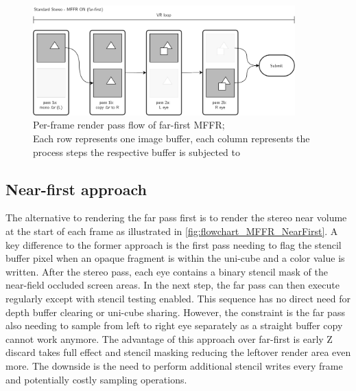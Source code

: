 \begin{figure}[htb]
  \centering
  \includegraphics[width=0.9\textwidth]{pictures/MFFR_farfirst}
  \caption{Per-frame render pass flow of far-first \gls{MFFR}; \\
  Each row represents one image buffer, each column represents the process steps the respective buffer is subjected to} \label{fig:flowchart_MFFR_FarFirst}
\end{figure}

\subsection{Near-first approach}
The alternative to rendering the far pass first is to render the stereo near volume at the start of each frame as illustrated in \autoref{fig:flowchart_MFFR_NearFirst}. A key difference to the former approach is the first pass needing to flag the stencil buffer pixel when an opaque fragment is within the uni-cube and a color value is written. After the stereo pass, each eye contains a binary stencil mask of the near-field occluded screen areas. In the next step, the far pass can then execute regularly except with stencil testing enabled. This sequence has no direct need for depth buffer clearing or uni-cube sharing. However, the constraint is the far pass also needing to sample from left to right eye separately as a straight buffer copy cannot work anymore. 
The advantage of this approach over far-first is early Z discard takes full effect and stencil masking reducing the leftover render area even more. The downside is the need to perform additional stencil writes every frame and potentially costly sampling operations.

